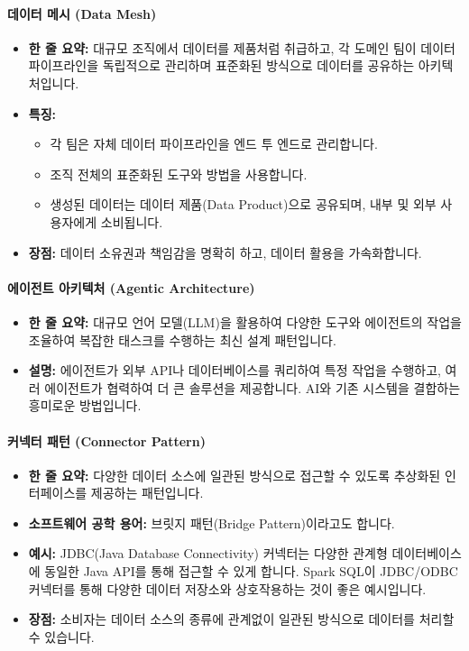 \documentclass[11pt,a4paper]{article}
\begin{document}
\paragraph{데이터 메시 (Data Mesh)}
\begin{itemize}
    \item \textbf{한 줄 요약:} 대규모 조직에서 데이터를 제품처럼 취급하고, 각 도메인 팀이 데이터 파이프라인을 독립적으로 관리하며 표준화된 방식으로 데이터를 공유하는 아키텍처입니다.
    \item \textbf{특징:}
    \begin{itemize}
        \item 각 팀은 자체 데이터 파이프라인을 엔드 투 엔드로 관리합니다.
        \item 조직 전체의 표준화된 도구와 방법을 사용합니다.
        \item 생성된 데이터는 데이터 제품(Data Product)으로 공유되며, 내부 및 외부 사용자에게 소비됩니다.
    \end{itemize}
    \item \textbf{장점:} 데이터 소유권과 책임감을 명확히 하고, 데이터 활용을 가속화합니다.
\end{itemize}

\paragraph{에이전트 아키텍처 (Agentic Architecture)}
\begin{itemize}
    \item \textbf{한 줄 요약:} 대규모 언어 모델(LLM)을 활용하여 다양한 도구와 에이전트의 작업을 조율하여 복잡한 태스크를 수행하는 최신 설계 패턴입니다.
    \item \textbf{설명:} 에이전트가 외부 API나 데이터베이스를 쿼리하여 특정 작업을 수행하고, 여러 에이전트가 협력하여 더 큰 솔루션을 제공합니다. AI와 기존 시스템을 결합하는 흥미로운 방법입니다.
\end{itemize}

\paragraph{커넥터 패턴 (Connector Pattern)}
\begin{itemize}
    \item \textbf{한 줄 요약:} 다양한 데이터 소스에 일관된 방식으로 접근할 수 있도록 추상화된 인터페이스를 제공하는 패턴입니다.
    \item \textbf{소프트웨어 공학 용어:} 브릿지 패턴(Bridge Pattern)이라고도 합니다.
    \item \textbf{예시:} JDBC(Java Database Connectivity) 커넥터는 다양한 관계형 데이터베이스에 동일한 Java API를 통해 접근할 수 있게 합니다. Spark SQL이 JDBC/ODBC 커넥터를 통해 다양한 데이터 저장소와 상호작용하는 것이 좋은 예시입니다.
    \item \textbf{장점:} 소비자는 데이터 소스의 종류에 관계없이 일관된 방식으로 데이터를 처리할 수 있습니다.
\end{itemize}
\end{document}
